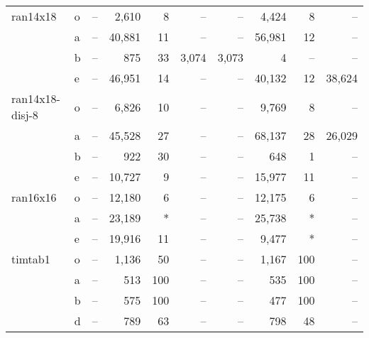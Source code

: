 \documentclass[11.5pt]{article}
\begin{document}
\begin{table}[H]
\begin{tabular}{l|l|rrr|rrrr|r}
ran14x18          & o & --    & 2,610 & 8  & --     & --    & 4,424 & 8    & -- \\
                  & a & --    & 40,881& 11 & --     & --    & 56,981& 12   & -- \\
                  & b & --    & 875   & 33 & 3,074  & 3,073 & 4     & --   & -- \\
                  & e & --    & 46,951& 14 & --     & --    & 40,132& 12   & 38,624 \\
ran14x18-disj-8   & o & --    & 6,826 & 10 & --     & --    & 9,769 & 8    & -- \\
                  & a & --    & 45,528& 27 & --     & --    & 68,137& 28   & 26,029 \\
                  & b & --    & 922   & 30 & --     & --    & 648   & 1    & -- \\
                  & e & --    & 10,727& 9  & --     & --    & 15,977& 11   & -- \\
ran16x16          & o & --    & 12,180& 6  & --     & --    & 12,175& 6    & -- \\
                  & a & --    & 23,189& *  & --     & --    & 25,738& *    & -- \\
                  & e & --    & 19,916& 11 & --     & --    & 9,477 & *    & -- \\
timtab1           & o & --    & 1,136 & 50 & --     & --    & 1,167 & 100  & -- \\
                  & a & --    & 513   & 100& --     & --    & 535   & 100  & -- \\
                  & b & --    & 575   & 100& --     & --    & 477   & 100  & -- \\
                  & d & --    & 789   & 63 & --     & --    & 798   & 48   & -- \\

\end{tabular}
\end{table}
\end{document}
